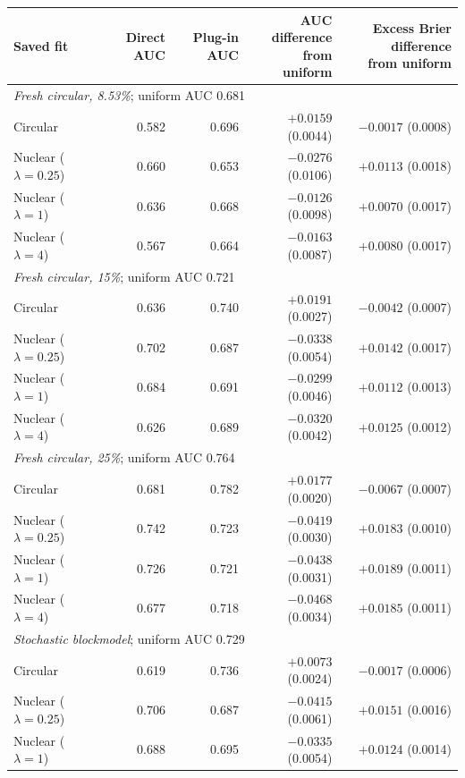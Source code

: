 \begin{tabular}{lrrrr}
\toprule
Saved fit & Direct AUC & Plug-in AUC & \shortstack{AUC difference\\from uniform} & \shortstack{Excess Brier difference\\from uniform} \\
\midrule
\multicolumn{5}{l}{\textit{Fresh circular, 8.53\%}; uniform AUC 0.681} \\
Circular & 0.582 & 0.696 & $+0.0159$ (0.0044) & $-0.0017$ (0.0008) \\
Nuclear ($\lambda=0.25$) & 0.660 & 0.653 & $-0.0276$ (0.0106) & $+0.0113$ (0.0018) \\
Nuclear ($\lambda=1$) & 0.636 & 0.668 & $-0.0126$ (0.0098) & $+0.0070$ (0.0017) \\
Nuclear ($\lambda=4$) & 0.567 & 0.664 & $-0.0163$ (0.0087) & $+0.0080$ (0.0017) \\
\midrule
\multicolumn{5}{l}{\textit{Fresh circular, 15\%}; uniform AUC 0.721} \\
Circular & 0.636 & 0.740 & $+0.0191$ (0.0027) & $-0.0042$ (0.0007) \\
Nuclear ($\lambda=0.25$) & 0.702 & 0.687 & $-0.0338$ (0.0054) & $+0.0142$ (0.0017) \\
Nuclear ($\lambda=1$) & 0.684 & 0.691 & $-0.0299$ (0.0046) & $+0.0112$ (0.0013) \\
Nuclear ($\lambda=4$) & 0.626 & 0.689 & $-0.0320$ (0.0042) & $+0.0125$ (0.0012) \\
\midrule
\multicolumn{5}{l}{\textit{Fresh circular, 25\%}; uniform AUC 0.764} \\
Circular & 0.681 & 0.782 & $+0.0177$ (0.0020) & $-0.0067$ (0.0007) \\
Nuclear ($\lambda=0.25$) & 0.742 & 0.723 & $-0.0419$ (0.0030) & $+0.0183$ (0.0010) \\
Nuclear ($\lambda=1$) & 0.726 & 0.721 & $-0.0438$ (0.0031) & $+0.0189$ (0.0011) \\
Nuclear ($\lambda=4$) & 0.677 & 0.718 & $-0.0468$ (0.0034) & $+0.0185$ (0.0011) \\
\midrule
\multicolumn{5}{l}{\textit{Stochastic blockmodel}; uniform AUC 0.729} \\
Circular & 0.619 & 0.736 & $+0.0073$ (0.0024) & $-0.0017$ (0.0006) \\
Nuclear ($\lambda=0.25$) & 0.706 & 0.687 & $-0.0415$ (0.0061) & $+0.0151$ (0.0016) \\
Nuclear ($\lambda=1$) & 0.688 & 0.695 & $-0.0335$ (0.0054) & $+0.0124$ (0.0014) \\

\end{tabular}
